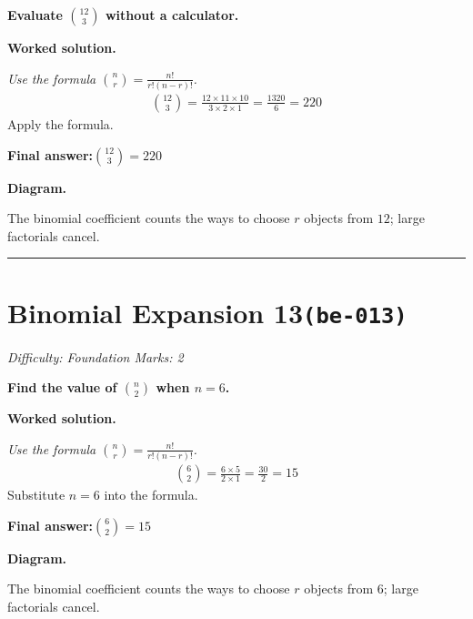 \documentclass[11pt]{article}
\newcommand{\question}[1]{\par\medskip\noindent\textbf{#1}\par}
\begin{document}
\question{Evaluate \( \binom{12}{3} \) without a calculator.}

\textbf{Worked solution.}

\textit{Use the formula \(\binom{n}{r} = \frac{n!}{r!(n-r)!}\).}
\[\begin{gathered}
\binom{12}{3} = \frac{12 \times 11 \times 10}{3 \times 2 \times 1} = \frac{1320}{6} = 220
\end{gathered}\]
Apply the formula.

\begin{answerbox}
\textbf{Final answer:}\quad \(\displaystyle \binom{12}{3} = 220\)
\end{answerbox}
\textbf{Diagram.}

\begin{center}
\end{center}
\small The binomial coefficient counts the ways to choose $r$ objects from $12$; large factorials cancel.\normalsize

\medskip\hrule

\section*{Binomial Expansion 13\quad\small\texttt{(be-013)}}
\textit{Difficulty: Foundation \quad\textbar\quad Marks: 2}

\question{Find the value of \( \binom{n}{2} \) when \( n = 6 \).}

\textbf{Worked solution.}

\textit{Use the formula \(\binom{n}{r} = \frac{n!}{r!(n-r)!}\).}
\[\begin{gathered}
\binom{6}{2} = \frac{6 \times 5}{2 \times 1} = \frac{30}{2} = 15
\end{gathered}\]
Substitute \(n = 6\) into the formula.

\begin{answerbox}
\textbf{Final answer:}\quad \(\displaystyle \binom{6}{2} = 15\)
\end{answerbox}
\textbf{Diagram.}

\begin{center}
\end{center}
\small The binomial coefficient counts the ways to choose $r$ objects from $6$; large factorials cancel.\normalsize
\end{document}
